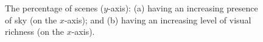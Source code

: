 

\begin{figure}[!t]
	\centering
	\hspace*{-5mm}
\vspace{-0.4cm}
\label{fig:bin_figures}
\caption{The percentage of scenes ($y$-axis): (a) having an increasing presence of sky (on the $x$-axis); and (b) having an increasing level of visual richness  (on the $x$-axis).}
\vspace{-0.4cm}
\end{figure}



